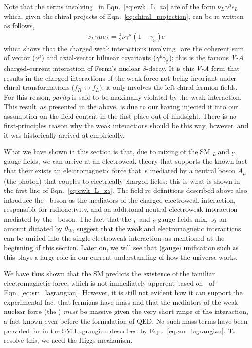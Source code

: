 Note that the terms involving \fieldWpm~in Eqn.~\ref{eq:ewk_L_za} are of the form $\bar{\nu}_L \gamma^{\mu} e_L$ which, given the chiral projects of Eqn.~\ref{eq:chiral_projection}, can be
re-written as follows,
\begin{align}
	\bar{\nu}_L \gamma{\mu} e_L = \frac{1}{2} \bar{\nu} \gamma^{\mu}(1-\gamma_5) e
	\label{eq:v_minus_a}
\end{align}
which shows that the charged weak interactions involving \fieldWpm~are the coherent
sum of vector ($\gamma^{\mu}$) and axial-vector bilinear covariants ($\gamma^{\mu}\gamma_5$); this is the famous \textit{V-A} charged-current interaction of Fermi's nuclear $\beta$-decay.
It is this \textit{V-A} form that results in the charged interactions of the weak force
not being invariant under chiral transformations ($f_R \leftrightarrow f_L$): it only involves
the left-chiral fermion fields. For this reason, \textit{parity}
is said to be maximally violated by the weak interaction.
This result, as presented in the above, is due to our having injected
it into our assumption on the field content in the first place out of hindsight. There
is no first-principles reason why the weak interactions should be this way, however,
and it was historically arrived at empirically.

What we have shown in this section is that, due to mixing of the SM \SUtwo$_L$
and \Uone$_Y$ gauge fields, we can arrive at an electroweak theory that supports
the known fact that their exists an electromagnetic force that is mediated
by a neutral boson $A_{\mu}$ (the photon) that couples to electrically charged fields: this is what
is shown in the first line of Eqn.~\ref{eq:ewk_L_za}. The field re-definitions described above
also introduce the \fieldWpm~boson as the mediators of the charged electroweak interaction,
responsible for radioactivity, and an additional neutral electroweak interaction mediated
by the \fieldZ~boson.
The fact that the \SUtwo$_L$ and \Uone$_Y$ gauge fields mix, by an amount dictated by $\theta_W$,
suggest that the weak and electromagnetic interactions can be unified into the single
electroweak interaction, as mentioned at the beginning of this section. Later on, we will see
that (gauge) unification such as this plays a large role in our current understanding
of how the universe works.

We have thus shown that the SM predicts the existence of the familiar electromagnetic force,
which is not immediately apparent based on \SML~of Eqn.~\ref{eq:sm_lagrangian}. 
However, it is still not evident how it can
support the experimental fact that fermions have mass and that the mediators of the
weak-nuclear force (the \fieldWpm) \textit{must} be massive given the very short
range of the interaction, a fact known
even before the formulation of QED. No such mass terms
have been provided for in the SM Lagrangian described by Eqn.~\ref{eq:sm_lagrangian}. To resolve this, we need the Higgs mechanism.